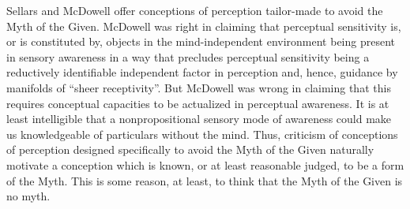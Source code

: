 \documentclass[12pt]{article}
\begin{document}
Sellars and McDowell offer conceptions of perception tailor-made to avoid the Myth of the Given. McDowell was right in claiming that perceptual sensitivity is, or is constituted by, objects in the mind-independent environment being present in sensory awareness in a way that precludes perceptual sensitivity being a reductively identifiable independent factor in perception and, hence, guidance by manifolds of “sheer receptivity”. But McDowell was wrong in claiming that this requires conceptual capacities to be actualized in perceptual awareness. It is at least intelligible that a nonpropositional sensory mode of awareness could make us knowledgeable of particulars without the mind. Thus, criticism of conceptions of perception designed specifically to avoid the Myth of the Given naturally motivate a conception which is known, or at least reasonable judged, to be a form of the Myth. This is some reason, at least, to think that the Myth of the Given is no myth. 

\end{document}
